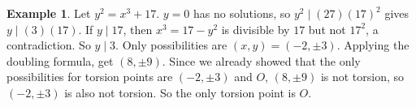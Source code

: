 \documentclass{article}
\newcommand{\rb}[1]{\left( #1 \right)}
\theoremstyle{definition}\newtheorem{definition}{Definition}[section]
\theoremstyle{definition}\newtheorem{remark}[definition]{Remark}
\theoremstyle{definition}\newtheorem*{example}{Example}
\theoremstyle{definition}\newtheorem*{note}{Note}
\begin{document}
\begin{example}
Let $ y^2 = x^3 + 17 $. $ y = 0 $ has no solutions, so $ y^2 \mid \rb{27}\rb{17}^2 $ gives $ y \mid \rb{3}\rb{17} $. If $ y \mid 17 $, then $ x^3 = 17 - y^2 $ is divisible by $ 17 $ but not $ 17^2 $, a contradiction. So $ y \mid 3 $. Only possibilities are $ \rb{x, y} = \rb{-2, \pm 3} $. Applying the doubling formula, get $ \rb{8, \pm 9} $. Since we already showed that the only possibilities for torsion points are $ \rb{-2, \pm 3} $ and $ O $, $ \rb{8, \pm 9} $ is not torsion, so $ \rb{-2, \pm 3} $ is also not torsion. So the only torsion point is $ O $.
\end{example}
\end{document}
